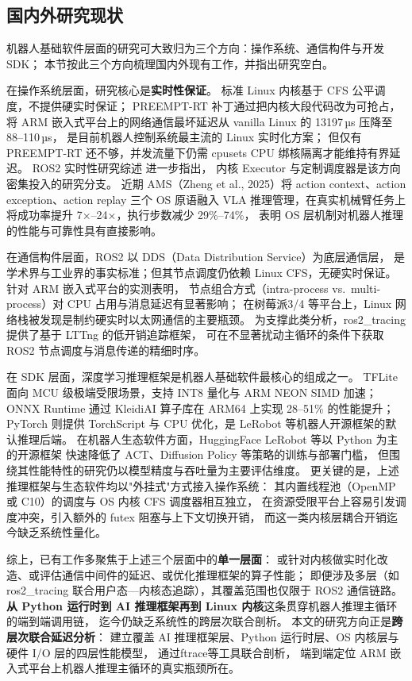 \subsection{国内外研究现状}\label{sec:related-work}

机器人基础软件层面的研究可大致归为三个方向：操作系统、通信构件与开发 SDK；
本节按此三个方向梳理国内外现有工作，并指出研究空白。

在操作系统层面，研究核心是\textbf{实时性保证}。
标准 Linux 内核基于 CFS 公平调度，不提供硬实时保证；
PREEMPT-RT 补丁通过把内核大段代码改为可抢占，
将 ARM 嵌入式平台上的网络通信最坏延迟从 vanilla Linux 的 13197\,µs 压降至 88–110\,µs\cite{rtlinux}，
是目前机器人控制系统最主流的 Linux 实时化方案；
但仅有 PREEMPT-RT 还不够，并发流量下仍需 cpusets CPU 绑核隔离才能维持有界延迟\cite{rtlinux}。
ROS2 实时性研究综述\cite{ros2rtsurvey} 进一步指出，
内核 Executor 与定制调度器是该方向密集投入的研究分支。
近期 AMS\cite{ams}（Zheng et al., 2025）将 action context、action exception、action replay
三个 OS 原语融入 VLA 推理管理，在真实机械臂任务上将成功率提升 7×–24×，执行步数减少 29\%–74\%，
表明 OS 层机制对机器人推理的性能与可靠性具有直接影响。

在通信构件层面，ROS2\cite{ros2} 以 DDS（Data Distribution Service）为底层通信层，
是学术界与工业界的事实标准；但其节点调度仍依赖 Linux CFS，无硬实时保证。
针对 ARM 嵌入式平台的实测表明，
节点组合方式（intra-process vs.\ multi-process）对 CPU 占用与消息延迟有显著影响\cite{ros2composition}；
在树莓派3/4 等平台上，Linux 网络栈被发现是制约硬实时以太网通信的主要瓶颈\cite{ros2ddsrpi}。
为支撑此类分析，ros2\_tracing\cite{ros2tracing} 提供了基于 LTTng 的低开销追踪框架，
可在不显著扰动主循环的条件下获取 ROS2 节点调度与消息传递的精细时序。

在 SDK 层面，深度学习推理框架是机器人基础软件最核心的组成之一。
TFLite\cite{tflite} 面向 MCU 级极端受限场景，支持 INT8 量化与 ARM NEON SIMD 加速；
ONNX Runtime\cite{onnxruntime} 通过 KleidiAI 算子库在 ARM64 上实现 28–51\% 的性能提升；
PyTorch 则提供 TorchScript 与 CPU 优化，是 LeRobot\cite{lerobot} 等机器人开源框架的默认推理后端。
在机器人生态软件方面，HuggingFace LeRobot 等以 Python 为主的开源框架
快速降低了 ACT\cite{act}、Diffusion Policy\cite{diffusionpolicy} 等策略的训练与部署门槛，
但围绕其性能特性的研究仍以模型精度与吞吐量为主要评估维度。
更关键的是，上述推理框架与生态软件均以"外挂式"方式接入操作系统：
其内置线程池（OpenMP 或 C10）的调度与 OS 内核 CFS 调度器相互独立，
在资源受限平台上容易引发调度冲突，引入额外的 futex 阻塞与上下文切换开销，
而这一类内核层耦合开销迄今缺乏系统性量化。

综上，已有工作多聚焦于上述三个层面中的\textbf{单一层面}：
或针对内核做实时化改造、或评估通信中间件的延迟、或优化推理框架的算子性能；
即便涉及多层（如 ros2\_tracing 联合用户态—内核态追踪），其覆盖范围也仅限于 ROS2 通信链路。
\textbf{从 Python 运行时到 AI 推理框架再到 Linux 内核}这条贯穿机器人推理主循环的端到端调用链，
迄今仍缺乏系统性的跨层次联合剖析。
本文的研究方向正是\textbf{跨层次联合延迟分析}：
建立覆盖 AI 推理框架层、Python 运行时层、OS 内核层与硬件 I/O 层的四层性能模型，
通过ftrace等工具联合剖析，
端到端定位 ARM 嵌入式平台上机器人推理主循环的真实瓶颈所在。
